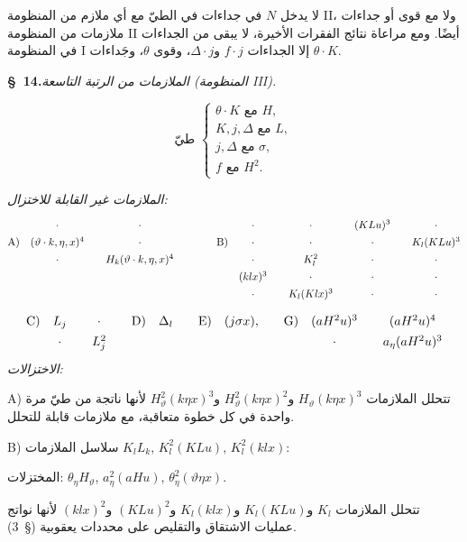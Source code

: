 \documentclass[11pt]{article}
\providecommand{\A}{\Delta}
\begin{document}
لا يدخل $N$ في جداءات في الطيّ مع أي ملازم من المنظومة II، ولا مع قوى أو جداءات ملازمات من المنظومة II أيضًا. ومع مراعاة نتائج الفقرات الأخيرة، لا يبقى من الجداءات في المنظومة I إلا الجداءات $f\cdot j$ و$\A\cdot j$، وقوى $\theta$، وجَداءات $\theta\cdot K$.

\begin{center}
\textbf{\S\ 14.}\quad\emph{الملازمات من الرتبة التاسعة (المنظومة III).}
\end{center}
\[
\text{طيّ }\left\{\begin{array}{l}
\theta\cdot K\text{ مع }H,\\
K,j,\A\text{ مع }L,\\
j,\A\text{ مع }\sigma,\\
f\text{ مع }H^2.
\end{array}\right.
\]


\noindent\emph{الملازمات غير القابلة للاختزال:}
\[
\renewcommand{\arraystretch}{1.35}
\begin{array}{@{}r@{\quad}c@{\qquad}c@{\qquad\qquad}r@{\quad}c@{\qquad}c@{\qquad}c@{\qquad}c@{}}
&\cdot&\cdot&&\cdot&\cdot&(KLu)^3&\cdot\\
\text{A)}&(\vartheta\cdot k,\eta,x)^4&\cdot&\text{B)}&\cdot&\cdot&\cdot&K_l(KLu)^3\\
&\cdot&H_k(\vartheta\cdot k,\eta,x)^4&&\cdot&K_l^2&\cdot&\cdot\\
&&&& (klx)^3&\cdot&\cdot&\cdot\\
&&&&\cdot&K_l(Klx)^3&\cdot&\cdot
\end{array}
\]
\[
\renewcommand{\arraystretch}{1.35}
\begin{array}{@{}r@{\quad}c@{\qquad}c@{\qquad}r@{\quad}c@{\qquad}r@{\quad}c@{\qquad}r@{\quad}c@{\qquad}c@{}}
\text{C)}&L_j&\cdot&\text{D)}&\A_l&\text{E)}&(j\sigma x),&\text{G)}&(aH^2u)^3&(aH^2u)^4\\
&\cdot&L_j^2&&&&&&\cdot&a_\eta(aH^2u)^3
\end{array}
\]
\noindent\emph{الاختزالات:}

A) تتحلل الملازمات $H_\vartheta(k\eta x)^3$ و$H_\vartheta^2(k\eta x)^2$ و$H_\vartheta^2(k\eta x)^3$ لأنها ناتجة من طيّ مرة واحدة في كل خطوة متعاقبة، مع ملازمات قابلة للتحلل.

B) سلاسل الملازمات $K_lL_k$, $K_l^2(KLu)$, $K_l^2(klx)$:

المختزلات: $\theta_\eta H_\vartheta$, $a_\eta^2(aHu)$, $\theta_\eta^2(\vartheta\eta x)$.

تتحلل الملازمات $K_l$ و$K_l(KLu)$ و$K_l(klx)$ و$(KLu)^2$ و$(klx)^2$ لأنها نواتج عمليات الاشتقاق والتقليص على محددات يعقوبية (\S\ 3).
\end{document}
